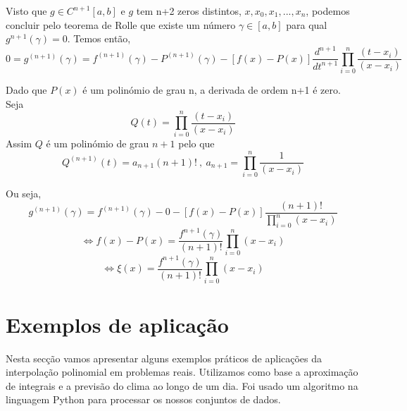 \documentclass[12pt]{article}
\begin{document}
    \hspace{0.5cm}Visto que $g \in C^{n+1}[a,b]$ e $g$ tem n+2 zeros distintos, $x, x_{0}, x_{1},..., x_{n}$, podemos  concluir pelo teorema de Rolle que existe um número $\gamma \in [a,b]$ para qual $g^{n+1}(\gamma)=0$. Temos então,
    \begin{equation}
    0=g^{(n+1)}(\gamma)=f^{(n+1)}(\gamma)-P^{(n+1)}(\gamma)- [f(x)-P(x)] \frac{d^{n+1}}{dt^{n+1}} \prod_{i=0}^{n} \frac{(t-x_{i})}{(x-x_{i})}
    \end{equation}
   
    \hspace{0.5cm}Dado que $P(x)$ é um polinómio de grau n, a derivada de ordem n+1 é zero. Seja
    \begin{equation}
    Q(t)=\prod_{i=0}^{n} \frac{(t-x_{i})}{(x-x_{i})}
    \end{equation}
    \hspace{0.5cm}Assim $Q$ é um polinómio de grau $n+1$ pelo que
    \begin{equation}
    Q^{(n+1)}(t)= a_{n+1} (n+1)!\   , \ a_{n+1}= \prod_{i=0}^{n} \frac{1}{(x-x_{i})}
    \end{equation}

    \hspace{0.5cm}Ou seja\cite{website0},
    \begin{equation}
    g^{(n+1)}(\gamma)=f^{(n+1)}(\gamma)-0-[f(x)-P(x)] \frac{(n+1)!}{\prod_{i=0}^{n}(x-x_{i})}
    \end{equation}
    \begin{equation}
    \Leftrightarrow f(x) - P(x)= \frac{f^{n+1}(\gamma)}{(n+1)!}  \prod_{i=0}^{n} (x-x_{i})
    \end{equation}
    \begin{equation}
    \Leftrightarrow \xi(x)= \frac{f^{n+1}(\gamma)}{(n+1)!}  \prod_{i=0}^{n} (x-x_{i})
    \end{equation}




\section{Exemplos de aplicação}
\hspace{0.5cm}Nesta secção vamos apresentar alguns exemplos práticos de aplicações da interpolação polinomial em problemas reais. Utilizamos como base a aproximação de integrais e a previsão do clima ao longo de um dia. Foi usado um algoritmo na linguagem Python para processar os nossos conjuntos de dados.
\end{document}
